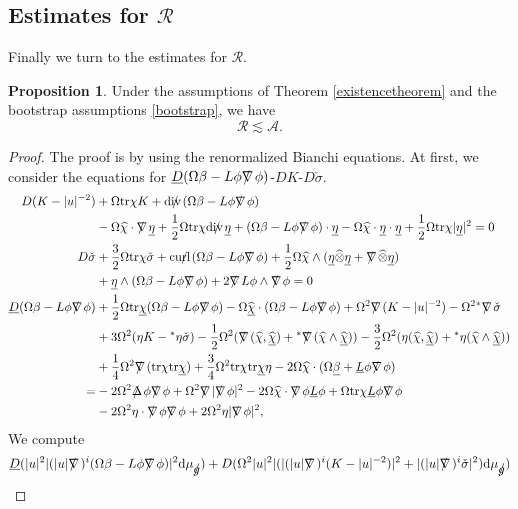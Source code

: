 \documentclass[11pt,reqno]{amsart}
\theoremstyle{definition}
\newtheorem{proposition}{Proposition}[section]
\numberwithin{equation}{section}
\newcommand{\D}{\mathrm{d}}
\newcommand{\tr}{\mathrm{tr}}
\def\betab{\underline{\beta}}
\def\chib{\underline{\chi}}
\def\chibh{\widehat{\underline{\chi}}}
\def\chih{\widehat{\chi}}
\def\etab{\underline{\eta}}
\def\Lb{\underline{L}}
\def\tr{\mathrm{tr}}
\def\sigmac{\check{\sigma}}
\def\tensor{\widehat{\otimes}}
\newcommand{\Db}{\underline{D}}
\def\nablas{\mbox{$\nabla \mkern -13mu /$ }}
\def\Deltas{\mbox{$\Delta \mkern -13mu /$ }}
\def\divs{\mbox{$\mathrm{div} \mkern -13mu /$ }}
\def\curls{\mbox{$\mathrm{curl} \mkern -13mu /$ }}
\def\ds{\mbox{$\nabla \mkern -13mu /$ }}
\def\gs{\mbox{$g \mkern -9mu /$}}
\begin{document}
\subsection{Estimates for $\mathcal{R}$}

Finally we turn to the estimates for $\mathcal{R}$.
\begin{proposition}\label{estimate-R}
Under the assumptions of Theorem \ref{existencetheorem} and the bootstrap assumptions \eqref{bootstrap}, we have
$$\mathcal{R}\lesssim\mathcal{A}.$$
\end{proposition}

\begin{proof}
The proof is by using the renormalized Bianchi equations. At first, we consider the equations for $\Db(\Omega\beta-L\phi\nablas\phi)$-$DK$-$D\check{\sigma}$. 
\begin{align*}
D(K-|u|^{-2})&+\Omega\tr\chi K+\divs(\Omega\beta-L\phi\nablas\phi)\\
&-\Omega\chih\cdot\nablas\etab+\frac{1}{2}\Omega\tr\chi\divs\etab+(\Omega\beta-L\phi\nablas\phi)\cdot\etab-\Omega\chih\cdot\etab\cdot\etab+\frac{1}{2}\Omega\tr\chi|\etab|^2=0\\
D\sigmac&+\frac{3}{2}\Omega\tr\chi\sigmac+\curls(\Omega\beta-L\phi\nablas\phi)+\frac{1}{2}\Omega\chih\wedge(\etab\tensor\etab+\nablas\tensor\etab)\\
&+\etab\wedge(\Omega\beta-L\phi\nablas\phi)+2\nablas L\phi\wedge\nablas\phi=0\\
\Db(\Omega\beta-L\phi\nablas\phi)&+\frac{1}{2}\Omega\tr\chib(\Omega\beta-L\phi\nablas\phi)-\Omega\chibh\cdot(\Omega\beta-L\phi\nablas\phi)+\Omega^2\ds (K-|u|^{-2})-\Omega^2{}^*\ds\sigmac\\
&+3\Omega^2(\eta K-{}^*\eta\sigmac)-\frac{1}{2}\Omega^2(\ds(\chih,\chibh)+{}^*\ds(\chih\wedge\chibh))-\frac{3}{2}\Omega^2(\eta(\chih,\chibh)+{}^*\eta(\chih\wedge\chibh))\\
&+\frac{1}{4}\Omega^2\ds(\tr\chi\tr\chib)+\frac{3}{4}\Omega^2\tr\chi\tr\chib\eta-2\Omega\chih\cdot(\Omega\betab+\Lb\phi\nablas\phi)\\
=&-2\Omega^2\Deltas\phi\nablas\phi+\Omega^2\ds|\ds\phi|^2-2\Omega\chih\cdot\nablas\phi\Lb\phi+\Omega\tr\chi\Lb\phi\nablas\phi\\
&-2\Omega^2\eta\cdot\nablas\phi\nablas\phi+2\Omega^2\eta|\ds\phi|^2,
\end{align*}
We compute
\begin{align*}
&\Db(|u|^2|(|u|\nablas)^i(\Omega\beta-L\phi\nablas\phi)|^2\D\mu_{\gs})+D(\Omega^2|u|^2|(|(|u|\nablas)^i(K-|u|^{-2})|^2+|(|u|\nablas)^i\check{\sigma}|^2)\D\mu_{\gs})\\

\end{align*}
\end{proof}
\end{document}
